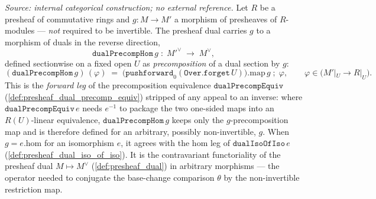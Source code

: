 \begin{definition}

  \label{def:presheaf_dual_precomp_hom}
  \textit{Source: internal categorical construction; no external reference.}
  Let \(R\) be a presheaf of commutative rings and \(g : M \to M'\) a morphism of presheaves of
  \(R\)-modules --- \emph{not} required to be invertible. The presheaf dual carries \(g\) to a
  morphism of duals in the reverse direction,
  \[
    \mathtt{dualPrecompHom}\,g \;\colon\; M'^\vee \;\longrightarrow\; M^\vee,
  \]
  defined sectionwise on a fixed open \(U\) as \emph{precomposition} of a dual section by \(g\):
  \[
    (\mathtt{dualPrecompHom}\,g)\,(\varphi) \;=\;
      \bigl(\mathtt{pushforward}_0(\mathtt{Over.forget}\,U)\bigr).\mathrm{map}\,g
        \;\mathbin{;}\; \varphi,
      \qquad \varphi \in \bigl(M'|_U \to R|_U\bigr).
  \]
  This is the \emph{forward leg} of the precomposition equivalence \(\mathtt{dualPrecompEquiv}\)
  (\cref{def:presheaf_dual_precomp_equiv}) stripped of any appeal to an inverse: where
  \(\mathtt{dualPrecompEquiv}\,e\) needs \(e^{-1}\) to package the two one-sided maps into an
  \(R(U)\)-linear equivalence, \(\mathtt{dualPrecompHom}\,g\) keeps only the \(g\)-precomposition map
  and is therefore defined for an arbitrary, possibly non-invertible, \(g\). When
  \(g = e.\mathrm{hom}\) for an isomorphism \(e\), it agrees with the \(\mathrm{hom}\) leg of
  \(\mathtt{dualIsoOfIso}\,e\) (\cref{def:presheaf_dual_iso_of_iso}). It is the contravariant
  functoriality of the presheaf dual \(M \mapsto M^\vee\) (\cref{def:presheaf_dual}) in arbitrary
  morphisms --- the operator needed to conjugate the base-change comparison \(\theta\) by the
  non-invertible restriction map.
\end{definition}

